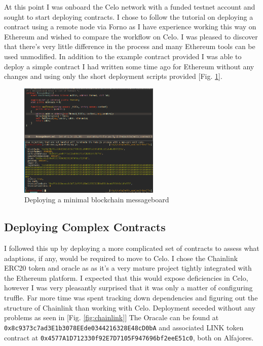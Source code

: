 \documentclass[a4paper,11pt]{article}
\begin{document}
At this point I was onboard the Celo network with a funded testnet account and
sought to start deploying contracts.  I chose to follow the tutorial on
deploying a contract using a remote node via Forno as I have experience
working this way on Ethereum and wished to compare the workflow on Celo.  I was
pleased to discover that there's very little difference in the process and many
Ethereum tools can be used unmodified.  In addition to the example contract
provided I was able to deploy a simple contract I had written some time ago for
Ethereum without any changes and using only the short deployment scripts
provided [Fig. \ref{fig:messageboard}].\\

\newpage

\begin{figure}[hbt!]
  \centering
  \includegraphics[width=0.6\textwidth]{deploy-messageboard}
  \caption{Deploying a minimal blockchain messageboard}
  \label{fig:messageboard}
\end{figure}


\subsection*{Deploying Complex Contracts}
I followed this up by deploying a more complicated set of contracts to assess
what adaptions, if any, would be required to move to Celo.  I chose the
Chainlink ERC20 token and oracle as
as it's a very mature project tightly integrated with the Ethereum platform.  I
expected that this would expose deficiencies in Celo, however I was very
pleasantly surprised that it was only a matter of configuring truffle.  Far more
time was spent tracking down dependencies and figuring out the structure of
Chainlink than working with Celo.  Deployment seceded without any problems as
seen in [Fig. \ref{fig:chainlink}]
The Oracale can be found at \verb|0x8c9373c7ad3E1b3078EEde0344216328E48cD0bA|
and associated LINK token contract at
\verb|0x4577A1D712330f92E7D7105F947696bf2eeE51c0|, both on Alfajores.
\end{document}
